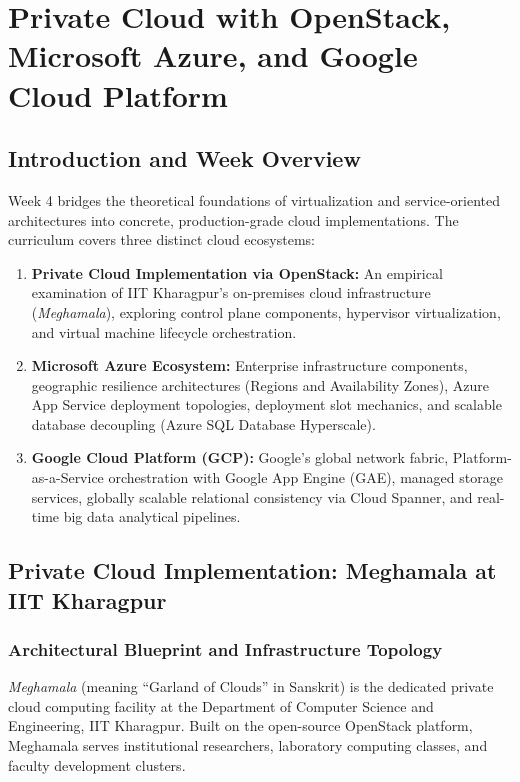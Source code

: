\chapter{Private Cloud with OpenStack, Microsoft Azure, and Google Cloud Platform}

\section{Introduction and Week Overview}
Week 4 bridges the theoretical foundations of virtualization and service-oriented architectures into concrete, production-grade cloud implementations. The curriculum covers three distinct cloud ecosystems:
\begin{enumerate}[leftmargin=*]
  \item \textbf{Private Cloud Implementation via OpenStack:} An empirical examination of IIT Kharagpur's on-premises cloud infrastructure (\emph{Meghamala}), exploring control plane components, hypervisor virtualization, and virtual machine lifecycle orchestration.
  \item \textbf{Microsoft Azure Ecosystem:} Enterprise infrastructure components, geographic resilience architectures (Regions and Availability Zones), Azure App Service deployment topologies, deployment slot mechanics, and scalable database decoupling (Azure SQL Database Hyperscale).
  \item \textbf{Google Cloud Platform (GCP):} Google's global network fabric, Platform-as-a-Service orchestration with Google App Engine (GAE), managed storage services, globally scalable relational consistency via Cloud Spanner, and real-time big data analytical pipelines.
\end{enumerate}

\section{Private Cloud Implementation: Meghamala at IIT Kharagpur}
\subsection{Architectural Blueprint and Infrastructure Topology}
\emph{Meghamala} (meaning ``Garland of Clouds'' in Sanskrit) is the dedicated private cloud computing facility at the Department of Computer Science and Engineering, IIT Kharagpur. Built on the open-source OpenStack platform, Meghamala serves institutional researchers, laboratory computing classes, and faculty development clusters.

